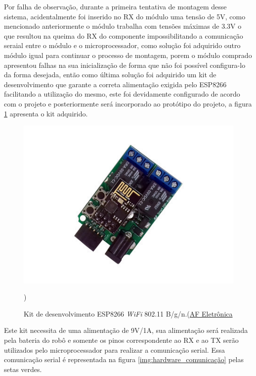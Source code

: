     	Por falha de observação, durante a primeira tentativa de montagem desse sistema, acidentalmente foi inserido no RX do módulo uma tensão de 5V, como mencionado anteriormente o módulo trabalha com tensões máximas de 3.3V o que resultou na queima do RX do componente impossibilitando a comunicação seraial entre o módulo e o microprocessador, como solução foi adquirido outro módulo igual para continuar o processo de montagem, porem o módulo comprado apresentou falhas na sua inicialização de forma que não foi possível configura-lo da forma desejada, então como última solução foi adquirido um kit de desenvolvimento que garante a correta alimentação exigida pelo ESP8266 facilitando a utilização do mesmo, este foi devidamente configurado de acordo com o projeto e posteriormente será incorporado ao protótipo do projeto, a figura \ref{img:kit_desenvolvimento} apresenta o kit adquirido.

    	\begin{figure}[H]                                                           
      		\centering                    
      		\includegraphics[scale=0.5]{figuras/kit_desenvolvimento.jpg}               
      		\caption{Kit de desenvolvimento ESP8266 \textit{WiFi} 802.11 B/g/n.(\href{http://www.afeletronica.com.br/pd-31421a-esp8266-wifi-802-11-b-g-n-kit-desenvolvimento.html}{AF Eletrônica}})    
      		\label{img:kit_desenvolvimento}                                            
    	\end{figure}

    	Este kit necessita de uma alimentação de 9V/1A, sua alimentação será realizada pela bateria do robô e somente os pinos correspondente ao RX e ao TX serão utilizados pelo microprocessador para realizar a comunicação serial. Essa comunicação serial é representada na figura \ref{img:hardware_comunicação} pelas setas verdes.


